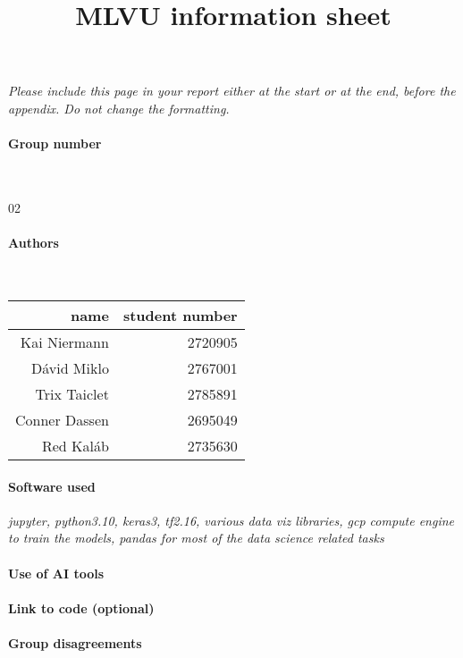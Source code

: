 \title{MLVU information sheet}
\author{}
\date{}
\maketitle

\noindent \textit{Please include this page in your report either at the start or at the end, before the appendix. Do not change the formatting.}

\paragraph{Group number}~

02

\paragraph{Authors}~

\begin{tabular}{r r}
name &student number \\
\hline
Kai Niermann & 2720905 \\
Dávid Miklo & 2767001 \\
Trix Taiclet & 2785891 \\
Conner Dassen & 2695049 \\
Red Kaláb & 2735630 \\
\end{tabular}

\paragraph{Software used} \textit{jupyter, python3.10, keras3, tf2.16, various data viz libraries, gcp compute engine to train the models, pandas for most of the data science related tasks}

\paragraph{Use of AI tools} \textit{}
\paragraph{Link to code (optional)} \textit{}

\paragraph{Group disagreements} \textit{}